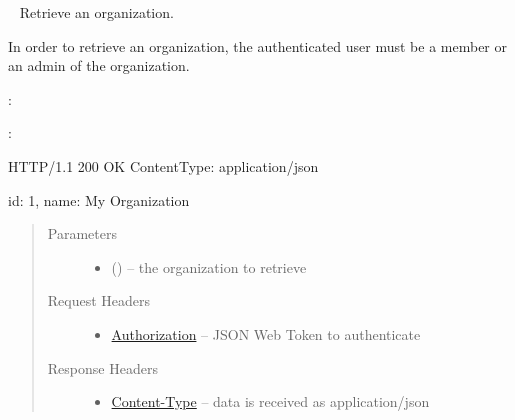 \documentclass[letterpaper,10pt,english]{sphinxmanual}
\begin{document}
\begin{fulllineitems}
\label{\detokenize{resources/organization:get--organizations-(organization_id)}}~
Retrieve an organization.

In order to retrieve an organization, the authenticated user must be a
member or an admin of the organization.

:

\begin{sphinxVerbatim}[commandchars=\\\{\}]
  
 
 
\end{sphinxVerbatim}

:

\begin{sphinxVerbatim}[commandchars=\\\{\}]
HTTP/1.1 200 OK
Content\PYGZhy{}Type: application/json

\PYGZob{}
    \PYGZsq{}id\PYGZsq{}: 1,
    \PYGZsq{}name\PYGZsq{}: \PYGZsq{}My Organization\PYGZsq{}
\PYGZcb{}
\end{sphinxVerbatim}
\begin{quote}\begin{description}
\item[{Parameters}] \leavevmode\begin{itemize}
\item {} 
 () -- the organization to retrieve

\end{itemize}

\item[{Request Headers}] \leavevmode\begin{itemize}
\item {} 
\href{http://tools.ietf.org/html/rfc7235\#section-4.2}{Authorization} -- JSON Web Token to authenticate

\end{itemize}

\item[{Response Headers}] \leavevmode\begin{itemize}
\item {} 
\href{http://tools.ietf.org/html/rfc7231\#section-3.1.1.5}{Content-Type} -- data is received as application/json


\end{itemize}
\end{description}
\end{quote}
\end{fulllineitems}
\end{document}

